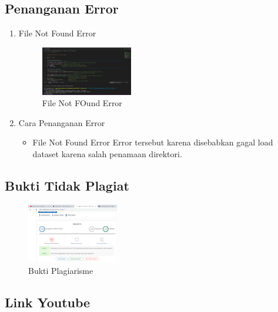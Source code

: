 \subsection{Penanganan Error}
\begin{enumerate}
	\item File Not Found Error
	\begin{figure}[H]
		\includegraphics[width=4cm]{figures/1174017/9/error.png}
		\centering
		\caption{File Not FOund Error}
	\end{figure}

	\item Cara Penanganan Error
	\begin{itemize}
		\item File Not Found Error
		\hfill\break
		Error tersebut karena disebabkan gagal load dataset karena salah penamaan direktori.
	\end{itemize}
\end{enumerate}

\subsection{Bukti Tidak Plagiat}
\begin{figure}[H]
	\includegraphics[width=4cm]{figures/1174017/9/plagiarisme.png}
	\centering
	\caption{Bukti Plagiarisme}
\end{figure}

\subsection{Link Youtube}